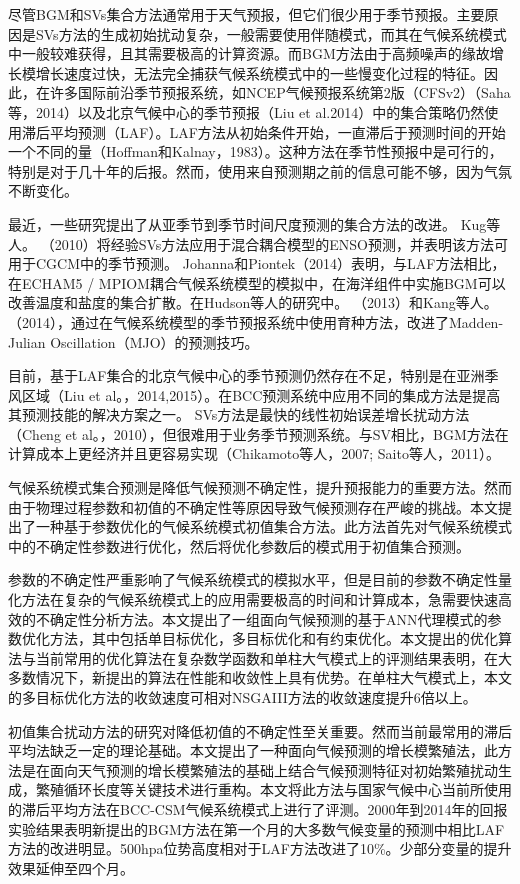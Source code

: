 尽管BGM和SVs集合方法通常用于天气预报，但它们很少用于季节预报。主要原因是SVs方法的生成初始扰动复杂，一般需要使用伴随模式，而其在气候系统模式中一般较难获得，且其需要极高的计算资源。而BGM方法由于高频噪声的缘故增长模增长速度过快，无法完全捕获气候系统模式中的一些慢变化过程的特征。因此，在许多国际前沿季节预报系统，如NCEP气候预报系统第2版（CFSv2）（Saha等，2014）以及北京气候中心的季节预报（Liu et al.2014）中的集合策略仍然使用滞后平均预测（LAF）。LAF方法从初始条件开始，一直滞后于预测时间的开始一个不同的量（Hoffman和Kalnay，1983）。这种方法在季节性预报中是可行的，特别是对于几十年的后报。然而，使用来自预测期之前的信息可能不够，因为气氛不断变化。

最近，一些研究提出了从亚季节到季节时间尺度预测的集合方法的改进。 Kug等人。 （2010）将经验SVs方法应用于混合耦合模型的ENSO预测，并表明该方法可用于CGCM中的季节预测。 Johanna和Piontek（2014）表明，与LAF方法相比，在ECHAM5 / MPIOM耦合气候系统模型的模拟中，在海洋组件中实施BGM可以改善温度和盐度的集合扩散。在Hudson等人的研究中。 （2013）和Kang等人。 （2014），通过在气候系统模型的季节预报系统中使用育种方法，改进了Madden-Julian Oscillation（MJO）的预测技巧。

目前，基于LAF集合的北京气候中心的季节预测仍然存在不足，特别是在亚洲季风区域（Liu et al。，2014,2015）。在BCC预测系统中应用不同的集成方法是提高其预测技能的解决方案之一。 SVs方法是最快的线性初始误差增长扰动方法（Cheng et al。，2010），但很难用于业务季节预测系统。与SV相比，BGM方法在计算成本上更经济并且更容易实现（Chikamoto等人，2007; Saito等人，2011）。


气候系统模式集合预测是降低气候预测不确定性，提升预报能力的重要方法。然而由于物理过程参数和初值的不确定性等原因导致气候预测存在严峻的挑战。本文提出了一种基于参数优化的气候系统模式初值集合方法。此方法首先对气候系统模式中的不确定性参数进行优化，然后将优化参数后的模式用于初值集合预测。

参数的不确定性严重影响了气候系统模式的模拟水平，但是目前的参数不确定性量化方法在复杂的气候系统模式上的应用需要极高的时间和计算成本，急需要快速高效的不确定性分析方法。本文提出了一组面向气候预测的基于ANN代理模式的参数优化方法，其中包括单目标优化，多目标优化和有约束优化。本文提出的优化算法与当前常用的优化算法在复杂数学函数和单柱大气模式上的评测结果表明，在大多数情况下，新提出的算法在性能和收敛性上具有优势。在单柱大气模式上，本文的多目标优化方法的收敛速度可相对NSGAIII方法的收敛速度提升6倍以上。

初值集合扰动方法的研究对降低初值的不确定性至关重要。然而当前最常用的滞后平均法缺乏一定的理论基础。本文提出了一种面向气候预测的增长模繁殖法，此方法是在面向天气预测的增长模繁殖法的基础上结合气候预测特征对初始繁殖扰动生成，繁殖循环长度等关键技术进行重构。本文将此方法与国家气候中心当前所使用的滞后平均方法在BCC-CSM气候系统模式上进行了评测。2000年到2014年的回报实验结果表明新提出的BGM方法在第一个月的大多数气候变量的预测中相比LAF方法的改进明显。500hpa位势高度相对于LAF方法改进了10\%。少部分变量的提升效果延伸至四个月。

